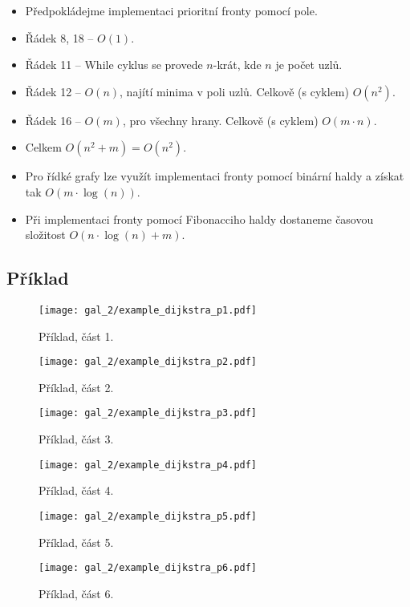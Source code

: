 \begin{itemize}
    \item Předpokládejme implementaci prioritní fronty pomocí pole.
    \item Řádek 8, 18 -- $O(1)$.
    \item Řádek 11 -- While cyklus se provede $n$-krát, kde $n$ je počet uzlů.
    \item Řádek 12 -- $O(n)$, najítí minima v poli uzlů. Celkově (s cyklem) $O(n^2)$.
    \item Řádek 16 -- $O(m)$, pro všechny hrany. Celkově (s cyklem) $O(m \cdot n)$.
    \item Celkem $O(n^2 + m) = O(n^2)$.
    \item Pro řídké grafy lze využít implementaci fronty pomocí binární haldy a získat tak $O(m \cdot \log(n))$.
    \item Při implementaci fronty pomocí Fibonacciho haldy dostaneme časovou složitost $O(n \cdot \log(n) + m)$.
\end{itemize}

\subsection*{Příklad}

\begin{figure}[H]
    \centering
    \texttt{[image: gal\_2/example\_dijkstra\_p1.pdf]}
    \caption{Příklad, část 1.}
\end{figure}

\begin{figure}[H]
    \centering
    \texttt{[image: gal\_2/example\_dijkstra\_p2.pdf]}
    \caption{Příklad, část 2.}
\end{figure}

\begin{figure}[H]
    \centering
    \texttt{[image: gal\_2/example\_dijkstra\_p3.pdf]}
    \caption{Příklad, část 3.}
\end{figure}

\begin{figure}[H]
    \centering
    \texttt{[image: gal\_2/example\_dijkstra\_p4.pdf]}
    \caption{Příklad, část 4.}
\end{figure}

\begin{figure}[H]
    \centering
    \texttt{[image: gal\_2/example\_dijkstra\_p5.pdf]}
    \caption{Příklad, část 5.}
\end{figure}

\begin{figure}[H]
    \centering
    \texttt{[image: gal\_2/example\_dijkstra\_p6.pdf]}
    \caption{Příklad, část 6.}
\end{figure}
